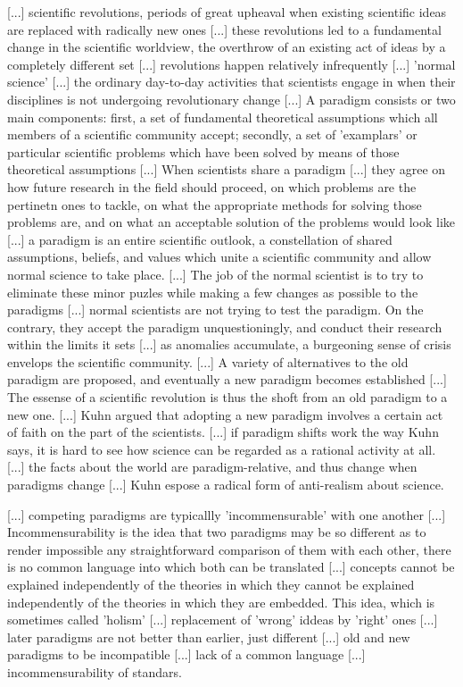 {\color{red}

[...] scientific revolutions, periods of great upheaval when existing scientific ideas are replaced with radically new ones [...] these revolutions led to a fundamental change in the scientific worldview, the overthrow of an existing act of ideas by a completely different set [...] revolutions happen relatively infrequently [...] 'normal science' [...] the ordinary day-to-day activities that scientists engage in when their disciplines is not undergoing revolutionary change [...] A paradigm consists or two main components: first, a set of fundamental theoretical assumptions which all members of a scientific community accept; secondly, a set of 'examplars' or particular scientific problems which have been solved by means of those theoretical assumptions [...] When scientists share a paradigm [...] they agree on how future research in the field should proceed, on which problems are the pertinetn ones to tackle, on what the appropriate methods for solving those problems are, and on what an acceptable solution of the problems would look like [...] a paradigm is an entire scientific outlook, a constellation of shared assumptions, beliefs, and values which unite a scientific community and allow normal science to take place. [...] The job of the normal scientist is to try to eliminate these minor puzles while making a few changes as possible to the paradigms [...] normal scientists are not trying to test the paradigm. On the contrary, they accept the paradigm unquestioningly, and conduct their research within the limits it sets [...] as anomalies accumulate, a burgeoning sense of crisis envelops the scientific community. [...] A variety of alternatives to the old paradigm are proposed, and eventually a new paradigm becomes established [...] The essense of a scientific revolution is thus the shoft from an old paradigm to a new one. [...] Kuhn argued that adopting a new paradigm involves a certain act of faith on the part of the scientists. [...] if paradigm shifts work the way Kuhn says, it is hard to see how science can be regarded as a rational activity at all. [...] the facts about the world are paradigm-relative, and thus change when paradigms change [...] Kuhn espose a radical form of anti-realism about science.

[...] competing paradigms are typicallly 'incommensurable' with one another [...] Incommensurability is the idea that two paradigms may be so different as to render impossible any straightforward comparison of them with each other, there is no common language into which both can be translated [...] concepts cannot be explained independently of the theories in which they cannot be explained independently of the theories in which they are embedded. This idea, which is sometimes called 'holism' [...] replacement of 'wrong' iddeas by 'right' ones [...] later paradigms are not better than earlier, just different [...] old and new paradigms to be incompatible [...] lack of a common language [...] incommensurability of standars.

}
